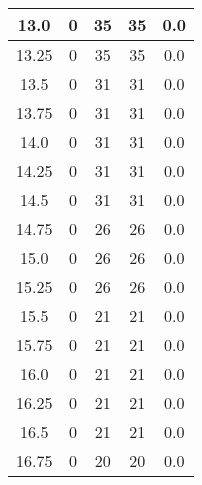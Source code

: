\documentclass[letterpaper, 12pt]{article}
\begin{document}
\begin{longtable}{|c|c|c|c|c|}
\hline
13.0 & 0 & 35 & 35 & 0.0 \\
\hline
13.25 & 0 & 35 & 35 & 0.0 \\
\hline
13.5 & 0 & 31 & 31 & 0.0 \\
\hline
13.75 & 0 & 31 & 31 & 0.0 \\
\hline
14.0 & 0 & 31 & 31 & 0.0 \\
\hline
14.25 & 0 & 31 & 31 & 0.0 \\
\hline
14.5 & 0 & 31 & 31 & 0.0 \\
\hline
14.75 & 0 & 26 & 26 & 0.0 \\
\hline
15.0 & 0 & 26 & 26 & 0.0 \\
\hline
15.25 & 0 & 26 & 26 & 0.0 \\
\hline
15.5 & 0 & 21 & 21 & 0.0 \\
\hline
15.75 & 0 & 21 & 21 & 0.0 \\
\hline
16.0 & 0 & 21 & 21 & 0.0 \\
\hline
16.25 & 0 & 21 & 21 & 0.0 \\
\hline
16.5 & 0 & 21 & 21 & 0.0 \\
\hline
16.75 & 0 & 20 & 20 & 0.0 \\
\hline
\end{longtable}
\end{document}
